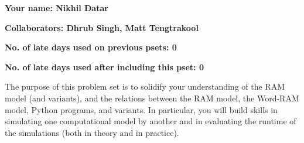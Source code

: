 \documentclass[11pt]{article}
\begin{document}

\textbf{Your name: Nikhil Datar}

\textbf{Collaborators: Dhrub Singh, Matt Tengtrakool}

\textbf{No. of late days used on previous psets: 0}

\textbf{No. of late days used after including this pset: 0}


The purpose of this problem set is to solidify your understanding of the RAM model (and variants), and the relations between the RAM model, the Word-RAM model, Python programs, and variants. In particular, you will build skills in simulating one computational model by another and in evaluating the runtime of the simulations (both in theory and in practice).
\end{document}
